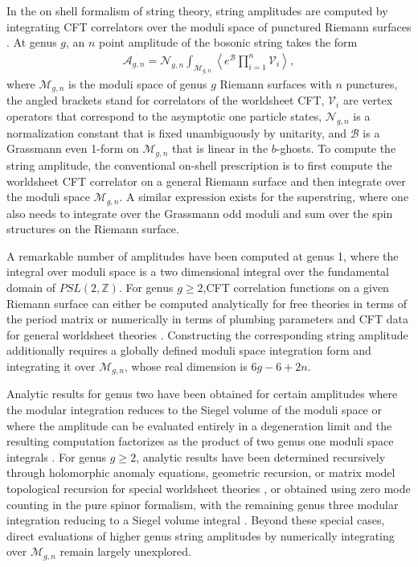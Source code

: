 \documentclass[12pt]{article}
\def\ie{\begin{equation}\begin{aligned}}
\def\fe{\end{aligned}\end{equation}}
\numberwithin{equation}{section}
\begin{document}
In the on shell formalism of string theory, string amplitudes are computed by integrating CFT correlators over the moduli space of punctured Riemann surfaces \cite{Polyakov:1981}. At genus $g$, an $n$ point amplitude of the bosonic string takes the form
\ie 
\mathcal{A}_{g,n} = \mathcal{N}_{g,n} \int_{\mathcal{M}_{g,n}} \left\langle  e^{\mathcal{B}} \prod_{i=1}^n \mathcal{V}_i\right\rangle,
\fe
where $\mathcal{M}_{g,n}$ is the moduli space of genus $g$ Riemann surfaces with $n$ punctures, the angled brackets stand for correlators of the worldsheet CFT, $\mathcal{V}_i$ are vertex operators that correspond to the asymptotic one particle states, $\mathcal{N}_{g,n}$ is a normalization constant that is fixed unambiguously by unitarity, and $\mathcal{B}$ is a Grassmann even 1-form on $\mathcal{M}_{g,n}$ that is linear in the $b$-ghosts. To compute the string amplitude, the conventional on-shell prescription is to first compute the worldsheet CFT correlator on a general Riemann surface and then integrate over the moduli space $\mathcal{M}_{g,n}$. A similar expression exists for the superstring, where one also needs to integrate over the Grassmann odd moduli and sum over the spin structures on the Riemann surface.

A remarkable number of amplitudes have been computed at genus 1, where the integral over moduli space is a two dimensional integral over the fundamental domain of $PSL(2,\mathbb{Z})$. For genus $g\geq 2$,CFT correlation functions on a given Riemann surface can either be computed analytically for free theories in terms of the period matrix \cite{Verlinde:1986kw,DHokerPhong:1988,DHokerPhong:1989Chiral} or numerically in terms of plumbing parameters and CFT data for general worldsheet theories \cite{Cho-Collier-Yin}. Constructing the corresponding string amplitude additionally requires a globally defined moduli space integration form and integrating it over $\mathcal{M}_{g,n}$, whose real dimension is $6g-6+2n$.

Analytic results for genus two have been obtained for certain amplitudes where the modular integration reduces to the Siegel volume of the moduli space or where the amplitude can be evaluated entirely in a degeneration limit and the resulting computation factorizes as the product of two genus one moduli space integrals  \cite{DHokerGutperlePhong:2005,DHokerGreenPiolineRusso:2015}. For genus $g\geq 2$, analytic results have been  determined recursively through holomorphic anomaly equations, geometric recursion, or matrix model topological recursion for special worldsheet theories \cite{Witten:1991Intersection,BCOV:1993,Mirzakhani:2007,EynardOrantin:2007,CollierEtAl:2024}, or obtained using zero mode counting in the pure spinor formalism, with the remaining genus three modular integration reducing to a Siegel volume integral \cite{Berkovits:2004Multiloop,Berkovits:2006HigherDerivative,GomezMafra:2013}. Beyond these special cases, direct evaluations of higher genus string amplitudes by numerically integrating over $\mathcal{M}_{g,n}$ remain largely unexplored.
\end{document}
